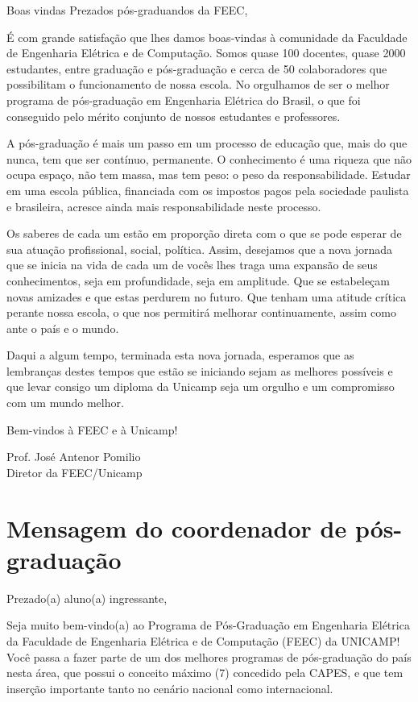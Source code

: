 \begin{story}{Boas vindas}
Prezados pós-graduandos da FEEC,

É com grande satisfação que lhes damos boas-vindas à comunidade da Faculdade de Engenharia Elétrica e de Computação. Somos quase 100 docentes, quase 2000 estudantes, entre graduação e pós-graduação e cerca de 50 colaboradores que possibilitam o funcionamento de nossa escola. No orgulhamos de ser o melhor programa de pós-graduação em Engenharia Elétrica do Brasil, o que foi conseguido pelo mérito conjunto de nossos estudantes e professores.

A pós-graduação é mais um passo em um processo de educação que, mais do que nunca, tem que ser contínuo, permanente. O conhecimento é uma riqueza que não ocupa espaço, não tem massa, mas tem peso: o peso da responsabilidade. Estudar em uma escola pública, financiada com os impostos pagos pela sociedade paulista e brasileira, acresce ainda mais responsabilidade neste processo.

Os saberes de cada um estão em proporção direta com o que se pode esperar de sua atuação profissional, social, política. Assim, desejamos que a nova jornada que se inicia na vida de cada um de vocês lhes traga uma expansão de seus conhecimentos, seja em profundidade, seja em amplitude. Que se estabeleçam novas amizades e que estas perdurem no futuro. Que tenham uma atitude crítica perante nossa escola, o que nos permitirá melhorar continuamente, assim como ante o país e o mundo.

Daqui a algum tempo, terminada esta nova jornada, esperamos que as lembranças destes tempos que estão se iniciando sejam as melhores possíveis e que levar consigo um diploma da Unicamp seja um orgulho e um compromisso com um mundo melhor.

Bem-vindos à FEEC e à Unicamp!

\begin{flushright}
Prof. José Antenor Pomilio \\
Diretor da FEEC/Unicamp
\end{flushright}

\section*{Mensagem do coordenador de pós-graduação}

Prezado(a) aluno(a) ingressante,

Seja muito bem-vindo(a) ao Programa de Pós-Graduação em Engenharia Elétrica da Faculdade de Engenharia Elétrica e de Computação (FEEC) da UNICAMP! Você passa a fazer parte de um dos melhores programas de pós-graduação do país nesta área, que possui o conceito máximo (7) concedido pela CAPES, e que tem inserção importante tanto no cenário nacional como internacional.


\end{story}
